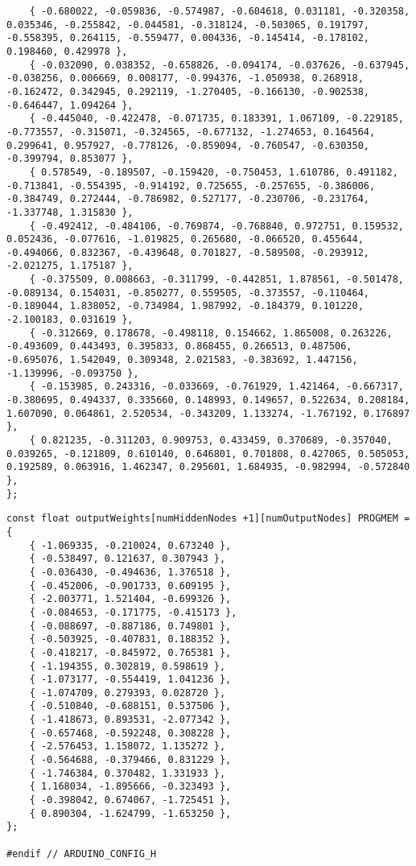 \documentclass[a4paper]{article}
\begin{document}
\begin{lstlisting}
    { -0.680022, -0.059836, -0.574987, -0.604618, 0.031181, -0.320358, 0.035346, -0.255842, -0.044581, -0.318124, -0.503065, 0.191797, -0.558395, 0.264115, -0.559477, 0.004336, -0.145414, -0.178102, 0.198460, 0.429978 }, 
    { -0.032090, 0.038352, -0.658826, -0.094174, -0.037626, -0.637945, -0.038256, 0.006669, 0.008177, -0.994376, -1.050938, 0.268918, -0.162472, 0.342945, 0.292119, -1.270405, -0.166130, -0.902538, -0.646447, 1.094264 }, 
    { -0.445040, -0.422478, -0.071735, 0.183391, 1.067109, -0.229185, -0.773557, -0.315071, -0.324565, -0.677132, -1.274653, 0.164564, 0.299641, 0.957927, -0.778126, -0.859094, -0.760547, -0.630350, -0.399794, 0.853077 }, 
    { 0.578549, -0.189507, -0.159420, -0.750453, 1.610786, 0.491182, -0.713841, -0.554395, -0.914192, 0.725655, -0.257655, -0.386006, -0.384749, 0.272444, -0.786982, 0.527177, -0.230706, -0.231764, -1.337748, 1.315830 }, 
    { -0.492412, -0.484106, -0.769874, -0.768840, 0.972751, 0.159532, 0.052436, -0.077616, -1.019825, 0.265680, -0.066520, 0.455644, -0.494066, 0.832367, -0.439648, 0.701827, -0.589508, -0.293912, -2.021275, 1.175187 }, 
    { -0.375509, 0.008663, -0.311799, -0.442851, 1.878561, -0.501478, -0.089134, 0.154031, -0.850277, 0.559505, -0.373557, -0.110464, -0.189044, 1.838052, -0.734984, 1.987992, -0.184379, 0.101220, -2.100183, 0.031619 }, 
    { -0.312669, 0.178678, -0.498118, 0.154662, 1.865008, 0.263226, -0.493609, 0.443493, 0.395833, 0.868455, 0.266513, 0.487506, -0.695076, 1.542049, 0.309348, 2.021583, -0.383692, 1.447156, -1.139996, -0.093750 }, 
    { -0.153985, 0.243316, -0.033669, -0.761929, 1.421464, -0.667317, -0.380695, 0.494337, 0.335660, 0.148993, 0.149657, 0.522634, 0.208184, 1.607090, 0.064861, 2.520534, -0.343209, 1.133274, -1.767192, 0.176897 }, 
    { 0.821235, -0.311203, 0.909753, 0.433459, 0.370689, -0.357040, 0.039265, -0.121809, 0.610140, 0.646801, 0.701808, 0.427065, 0.505053, 0.192589, 0.063916, 1.462347, 0.295601, 1.684935, -0.982994, -0.572840 }, 
};
\end{lstlisting}
\newpage
\begin{lstlisting}
const float outputWeights[numHiddenNodes +1][numOutputNodes] PROGMEM = {
    { -1.069335, -0.210024, 0.673240 }, 
    { -0.538497, 0.121637, 0.307943 }, 
    { -0.036430, -0.494636, 1.376518 }, 
    { -0.452006, -0.901733, 0.609195 }, 
    { -2.003771, 1.521404, -0.699326 }, 
    { -0.084653, -0.171775, -0.415173 }, 
    { -0.088697, -0.887186, 0.749801 }, 
    { -0.503925, -0.407831, 0.188352 }, 
    { -0.418217, -0.845972, 0.765381 }, 
    { -1.194355, 0.302819, 0.598619 }, 
    { -1.073177, -0.554419, 1.041236 }, 
    { -1.074709, 0.279393, 0.028720 }, 
    { -0.510840, -0.688151, 0.537506 }, 
    { -1.418673, 0.893531, -2.077342 }, 
    { -0.657468, -0.592248, 0.308228 }, 
    { -2.576453, 1.158072, 1.135272 }, 
    { -0.564688, -0.379466, 0.831229 }, 
    { -1.746384, 0.370482, 1.331933 }, 
    { 1.168034, -1.895666, -0.323493 }, 
    { -0.398042, 0.674067, -1.725451 }, 
    { 0.890304, -1.624799, -1.653250 }, 
};

#endif // ARDUINO_CONFIG_H
\end{lstlisting}
\end{document}
